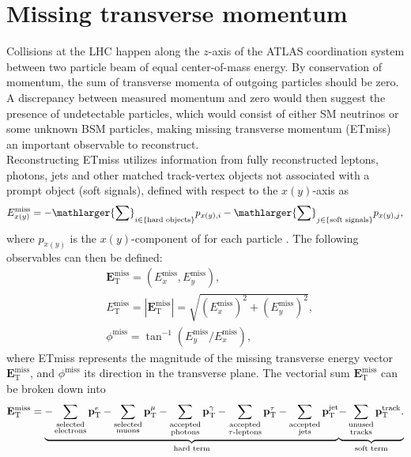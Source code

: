 \documentclass[../thesis.tex]{subfiles}
\begin{document}
\section{Missing transverse momentum}
\label{sec:met}
Collisions at the \acs{LHC} happen along the $z$-axis of the ATLAS coordination system between two particle beam of equal center-of-mass energy. By conservation of momentum, the sum of transverse momenta of outgoing particles should be zero. A discrepancy between measured momentum and zero would then suggest the presence of undetectable particles, which would consist of either \acs{SM} neutrinos or some unknown \acs{BSM} particles, making missing transverse momentum (\acs{ETmiss}) an important observable to reconstruct.\\
Reconstructing \acs{ETmiss} utilizes information from fully reconstructed leptons, photons, jets and other matched track-vertex objects not associated with a prompt object (soft signals), defined with respect to the $x (y)$-axis as 
\begin{equation}
E^\mathrm{miss}_{x (y)} = -\mathlarger{\sum}_{i \in \{\text{hard objects}\}} p_{x (y),i} -\mathlarger{\sum}_{j \in \{\text{soft signals}\}} p_{x (y),j},
\end{equation}
where $p_{x(y)}$ is the $x(y)$-component of \pT for each particle \citep{reco:met}. The following observables can then be defined:
\begin{equation}
\begin{aligned}
& \mathbf{E}_\mathrm{T}^\mathrm{miss}=(E^\mathrm{miss}_{x},E^\mathrm{miss}_{y}),\\
& E_\mathrm{T}^\mathrm{miss}=|\mathbf{E}_\mathrm{T}^\mathrm{miss}|=\sqrt{(E^\mathrm{miss}_{x})^2+(E^\mathrm{miss}_{y})^2},\\
& \phi^\mathrm{miss}=\tan^{-1}(E^\mathrm{miss}_{y}/E^\mathrm{miss}_{x}),
\end{aligned}
\end{equation}
where \acs{ETmiss} represents the magnitude of the missing transverse energy vector $\mathbf{E}_\mathrm{T}^\mathrm{miss}$, and $\phi^\mathrm{miss}$ its direction in the transverse plane. The vectorial sum $\mathbf{E}_\mathrm{T}^\mathrm{miss}$ can be broken down into
\begin{equation}
\mathbf{E}_\mathrm{T}^\mathrm{miss} =
{\underbrace{
-\sum_{\substack{\text{selected}\\ \text{electrons}}} \mathbf{p}_\mathrm{T}^e
-\sum_{\substack{\text{selected}\\ \text{muons}}} \mathbf{p}_\mathrm{T}^\mu
-\sum_{\substack{\text{accepted}\\ \text{photons}}} \mathbf{p}_\mathrm{T}^\gamma
-\sum_{\substack{\text{accepted}\\ \text{\ensuremath{\tau}-leptons}}} \mathbf{p}_\mathrm{T}^\tau
-\sum_{\substack{\text{accepted}\\ \text{jets}}} \mathbf{p}_\mathrm{T}^\mathrm{jet}
}_\text{hard term}}
{\underbrace{
-\sum_{\substack{\vphantom{p}\text{unused}\\ \vphantom{p}\text{tracks}}} \mathbf{p}_\mathrm{T}^\mathrm{track}.
}_\text{soft term}}
\end{equation}
\end{document}
